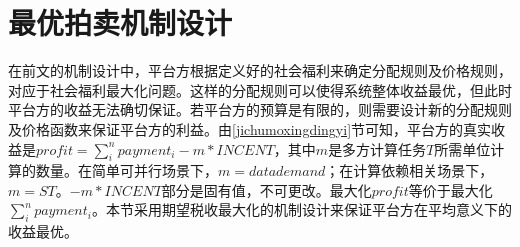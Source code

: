\documentclass[promaster]{thesis-uestc}
\begin{document}
%

%




%





\section{最优拍卖机制设计}

在前文的机制设计中，平台方根据定义好的社会福利来确定分配规则及价格规则，对应于社会福利最大化问题。这样的分配规则可以使得系统整体收益最优，但此时平台方的收益无法确切保证。若平台方的预算是有限的，则需要设计新的分配规则及价格函数来保证平台方的利益。由\ref{jichumoxingdingyi}节可知，平台方的真实收益是$profit = \sum_{i}^{n}{payment_i}-m*INCENT$，其中$m$是多方计算任务$T$所需单位计算的数量。在简单可并行场景下，$m=datademand$；在计算依赖相关场景下，$m=ST$。$-m*INCENT$部分是固有值，不可更改。最大化$profit$等价于最大化$\sum_{i}^{n}{payment_i}$。本节采用期望税收最大化的机制设计来保证平台方在平均意义下的收益最优。
\end{document}
